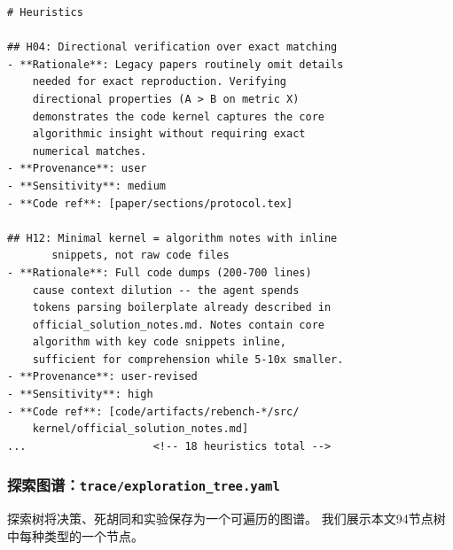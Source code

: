 \documentclass[
]{article}
\theoremstyle{definition}
\begin{document}
\begin{lstlisting}
# Heuristics

## H04: Directional verification over exact matching
- **Rationale**: Legacy papers routinely omit details
    needed for exact reproduction. Verifying
    directional properties (A > B on metric X)
    demonstrates the code kernel captures the core
    algorithmic insight without requiring exact
    numerical matches.
- **Provenance**: user
- **Sensitivity**: medium
- **Code ref**: [paper/sections/protocol.tex]

## H12: Minimal kernel = algorithm notes with inline
       snippets, not raw code files
- **Rationale**: Full code dumps (200-700 lines)
    cause context dilution -- the agent spends
    tokens parsing boilerplate already described in
    official_solution_notes.md. Notes contain core
    algorithm with key code snippets inline,
    sufficient for comprehension while 5-10x smaller.
- **Provenance**: user-revised
- **Sensitivity**: high
- **Code ref**: [code/artifacts/rebench-*/src/
    kernel/official_solution_notes.md]
...                    <!-- 18 heuristics total -->
\end{lstlisting}

\subsubsection{\texorpdfstring{探索图谱：\texttt{trace/exploration\_tree.yaml}}{探索图谱：trace/exploration\_tree.yaml}}\label{ux63a2ux7d22ux56feux8c31traceexploration_tree.yaml}

探索树将决策、死胡同和实验保存为一个可遍历的图谱。
我们展示本文94节点树中每种类型的一个节点。
\end{document}
